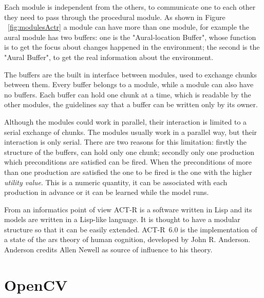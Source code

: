 Each module is independent from the others, to communicate one to each other they need to pass through the procedural module. As shown in Figure  ~\ref{fig:modulesActr} a module can have more than one module, for example the aural module has two buffers: one is the "Aural-location Buffer", whose function is to get the focus about changes happened in the environment; the second is the "Aural Buffer", to get the real information about the environment.

The buffers are the built in interface between modules, used to exchange chunks between them. Every buffer belongs to a module, while a module can also have no buffers. Each buffer can hold one chunk at a time, which is readable by the other modules, the guidelines say that a buffer can be written only by its owner. 

Although the modules could work in parallel, their interaction is limited to a serial exchange of chunks. The modules usually work in a parallel way, but their interaction is only serial. There are two reasons for this limitation: firstly the structure of the buffers, can hold only one chunk; secondly only one production which preconditions are satisfied can be fired. When the preconditions of more than one production are satisfied the one to be fired is the one with the higher \emph{utility value}. This is a numeric quantity, it can be associated with each production in advance or it can be learned while the model runs.



From an informatics point of view \mbox{ACT-R} is a software written in Lisp and its models are written in a Lisp-like language. It is thought to have a modular structure so that it can be easily extended. \mbox{ACT-R 6.0} is the implementation of a state of the ars theory of human cognition, developed by John R. Anderson. Anderson credits Allen Newell as source of influence to his theory.
\newpage
\section{OpenCV}
